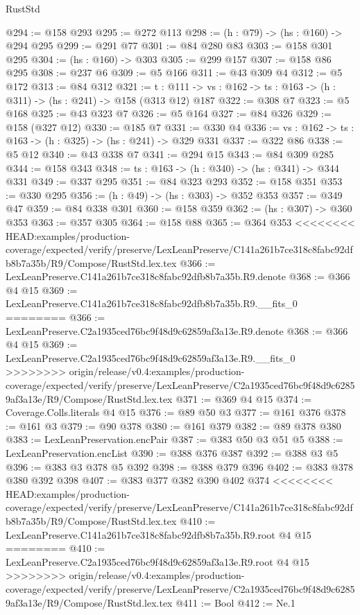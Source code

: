\begin{lexlean}{RustStd}
\begin{coremodule}
{\begin{coremodule}
@294 := @158 @293
@295 := @272 @113
@298 := (h : @79) -> (hs : @160) -> @294 @295
@299 := @291 @77
@301 := @84 @280 @83
@303 := @158 @301 @295
@304 := (hs : @160) -> @303
@305 := @299 @157
@307 := @158 @86 @295
@308 := @237 @6
@309 := @5 @166
@311 := @43 @309 @4
@312 := @5 @172
@313 := @84 @312
@321 := {t : @111} ->
  {vs : @162} -> {ts : @163} -> (h : @311) -> (hs : @241) -> @158 (@313 @12) @187
@322 := @308 @7
@323 := @5 @168
@325 := @43 @323 @7
@326 := @5 @164
@327 := @84 @326
@329 := @158 (@327 @12)
@330 := @185 @7
@331 := @330 @4
@336 := {vs : @162} -> {ts : @163} -> (h : @325) -> (hs : @241) -> @329 @331
@337 := @322 @86
@338 := @5 @12
@340 := @43 @338 @7
@341 := @294 @15
@343 := @84 @309 @285
@344 := @158 @343
@348 := {ts : @163} -> (h : @340) -> (hs : @341) -> @344 @331
@349 := @337 @295
@351 := @84 @323 @293
@352 := @158 @351
@353 := @330 @295
@356 := (h : @49) -> (hs : @303) -> @352 @353
@357 := @349 @47
@359 := @84 @338 @301
@360 := @158 @359
@362 := (hs : @307) -> @360 @353
@363 := @357 @305
@364 := @158 @88
@365 := @364 @353
<<<<<<<< HEAD:examples/production-coverage/expected/verify/preserve/LexLeanPreserve/C141a261b7ce318c8fabc92dfb8b7a35b/R9/Compose/RustStd.lex.tex
@366 := LexLeanPreserve.C141a261b7ce318c8fabc92dfb8b7a35b.R9.denote
@368 := @366 @4 @15
@369 := LexLeanPreserve.C141a261b7ce318c8fabc92dfb8b7a35b.R9.__fits_0
========
@366 := LexLeanPreserve.C2a1935ced76bc9f48d9c62859af3a13e.R9.denote
@368 := @366 @4 @15
@369 := LexLeanPreserve.C2a1935ced76bc9f48d9c62859af3a13e.R9.__fits_0
>>>>>>>> origin/release/v0.4:examples/production-coverage/expected/verify/preserve/LexLeanPreserve/C2a1935ced76bc9f48d9c62859af3a13e/R9/Compose/RustStd.lex.tex
@371 := @369 @4 @15
@374 := Coverage.Colls.literals @4 @15
@376 := @89 @50 @3
@377 := @161 @376
@378 := @161 @3
@379 := @90 @378
@380 := @161 @379
@382 := @89 @378 @380
@383 := LexLeanPreservation.encPair
@387 := @383 @50 @3 @51 @5
@388 := LexLeanPreservation.encList
@390 := @388 @376 @387
@392 := @388 @3 @5
@396 := @383 @3 @378 @5 @392
@398 := @388 @379 @396
@402 := @383 @378 @380 @392 @398
@407 := @383 @377 @382 @390 @402 @374
<<<<<<<< HEAD:examples/production-coverage/expected/verify/preserve/LexLeanPreserve/C141a261b7ce318c8fabc92dfb8b7a35b/R9/Compose/RustStd.lex.tex
@410 := LexLeanPreserve.C141a261b7ce318c8fabc92dfb8b7a35b.R9.root @4 @15
========
@410 := LexLeanPreserve.C2a1935ced76bc9f48d9c62859af3a13e.R9.root @4 @15
>>>>>>>> origin/release/v0.4:examples/production-coverage/expected/verify/preserve/LexLeanPreserve/C2a1935ced76bc9f48d9c62859af3a13e/R9/Compose/RustStd.lex.tex
@411 := Bool
@412 := Ne.{1}

\end{coremodule}}
\end{coremodule}
\end{lexlean}
